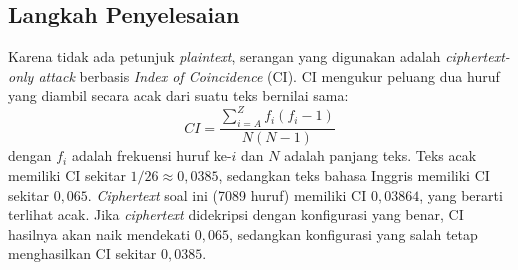 \subsection*{Langkah Penyelesaian}

Karena tidak ada petunjuk \textit{plaintext}, serangan yang digunakan adalah \textit{ciphertext-only attack}
berbasis \textit{Index of Coincidence} (CI). CI mengukur peluang dua huruf yang diambil secara acak dari
suatu teks bernilai sama:
\begin{equation*}
  CI = \frac{\sum_{i=A}^{Z} f_i (f_i - 1)}{N (N - 1)}
\end{equation*}
dengan $f_i$ adalah frekuensi huruf ke-$i$ dan $N$ adalah panjang teks. Teks acak memiliki CI sekitar
$1/26 \approx 0{,}0385$, sedangkan teks bahasa Inggris memiliki CI sekitar $0{,}065$. \textit{Ciphertext}
soal ini (7089 huruf) memiliki CI $0{,}03864$, yang berarti terlihat acak. Jika \textit{ciphertext}
didekripsi dengan konfigurasi yang benar, CI hasilnya akan naik mendekati $0{,}065$, sedangkan konfigurasi
yang salah tetap menghasilkan CI sekitar $0{,}0385$.

